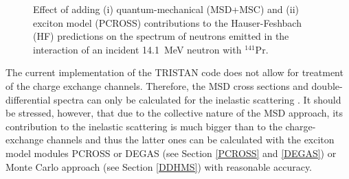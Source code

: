 \documentclass[twocolumn,amsmath,amssymb,10pt,groupedaddress,a4paper]{revtex4}
\begin{document}
\begin{figure}[htbp]
\caption{Effect of adding (i) quantum-mechanical (MSD+MSC) and (ii) exciton model (PCROSS) contributions to the Hauser-Feshbach (HF) predictions on the spectrum of neutrons emitted in the interaction of an incident
14.1~MeV neutron with $^{141}$Pr.}
\label{PrMSD}
\end{figure}


The current implementation of the TRISTAN
code does not allow for treatment of the charge exchange channels.
Therefore, the MSD cross sections and double-differential
spectra can only be calculated for the inelastic scattering . It should
be stressed, however, that due to the collective nature of the MSD
approach, its contribution to the inelastic scattering is much bigger
than to the charge-exchange channels and thus the latter ones can
be calculated with the exciton model modules PCROSS or DEGAS (see Section
\ref{PCROSS} and \ref{DEGAS}) or Monte Carlo approach (see Section \ref{DDHMS}) with
reasonable accuracy.


\end{document}
